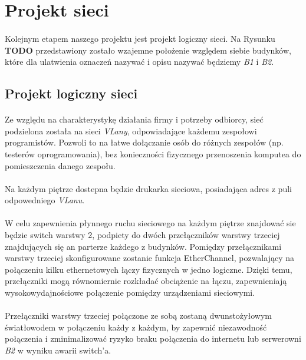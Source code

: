 \newpage
\section{Projekt sieci}
\paragraph{}
Kolejnym etapem naszego projektu jest projekt logiczny sieci. Na Rysunku \textbf{TODO} przedstawiony zostało wzajemne położenie względem siebie budynków, które dla ulatwienia oznaczeń nazywać i opisu nazywać będziemy \textit{B1} i \textit{B2}. 

\subsection{Projekt logiczny sieci}
\paragraph{}
Ze względu na charakterystykę działania firmy i potrzeby odbiorcy, sieć podzielona została na sieci \textit{VLany}, odpowiadające każdemu zespołowi programistów. Pozwoli to na łatwe dołączanie osób do różnych zespołów (np. testerów oprogramowania), bez konieczności fizycznego przenoszenia komputea do pomieszczenia danego zespołu.

\paragraph{}
Na każdym piętrze dostepna będzie drukarka sieciowa, posiadająca adres z puli odpowedniego \textit{VLanu}.

\paragraph{}
W celu zapewnienia płynnego ruchu sieciowego na każdym piętrze znajdować sie będzie switch warstwy 2, podpiety do dwóch przełączników warstwy trzeciej znajdujących się an parterze każdego z budynków. Pomiędzy przełącznikami warstwy trzeciej skonfigurowane zostanie funkcja EtherChannel, pozwalający na połączeniu kilku ethernetowych łączy fizycznych w jedno logiczne. Dzięki temu, przełączniki mogą równomiernie rozkładać obciążenie na łączu, zapewnieniają wysokowydajnościowe połączenie pomiędzy urządzeniami sieciowymi.

\paragraph{} 
Przełączniki warstwy trzeciej połączone ze sobą zostaną dwunstożyłowym światłowodem w połączeniu każdy z każdym, by zapewnić niezawodność połączenia i zminimalizować ryzyko braku połączenia do internetu lub serwerowni \textit{B2} w wyniku awarii switch'a.

